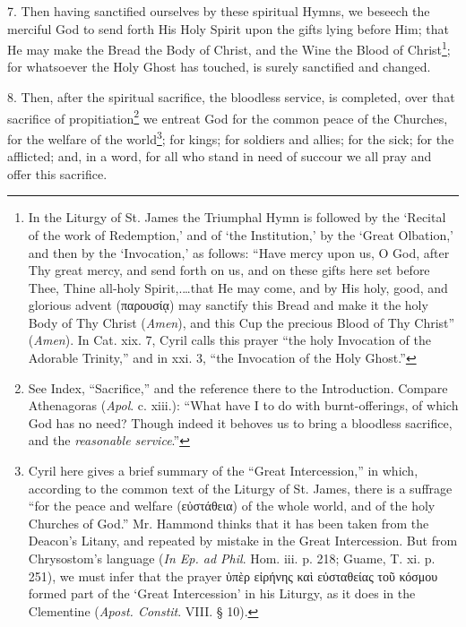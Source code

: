 7. Then having sanctified ourselves by these spiritual Hymns, we beseech the merciful God to send forth His Holy Spirit upon the gifts lying before Him; that He may make the Bread the Body of Christ, and the Wine the Blood of Christ\footnote{In the Liturgy of St. James the Triumphal Hymn is followed by the ‘Recital of the work of Redemption,’ and of ‘the Institution,’ by the ‘Great Olbation,’ and then by the ‘Invocation,’ as follows: “Have mercy upon us, O God, after Thy great mercy, and send forth on us, and on these gifts here set before Thee, Thine all-holy Spirit,.…that He may come, and by His holy, good, and glorious advent (\textgreek{παρουσίᾳ}) may sanctify this Bread and make it the holy Body of Thy Christ (\emph{Amen}), and this Cup the precious Blood of Thy Christ” (\emph{Amen}). In Cat. xix. 7, Cyril calls this prayer “the holy Invocation of the Adorable Trinity,” and in xxi. 3, “the Invocation of the Holy Ghost.”}; for whatsoever the Holy Ghost has touched, is surely sanctified and changed.

8. Then, after the spiritual sacrifice, the bloodless service, is completed, over that sacrifice of propitiation\footnote{See Index, “Sacrifice,” and the reference there to the Introduction. Compare Athenagoras (\emph{Apol}. c. xiii.): “What have I to do with burnt-offerings, of which God has no need? Though indeed it behoves us to bring a bloodless sacrifice, and the \emph{reasonable service}.”} we entreat God for the common peace of the Churches, for the welfare of the world\footnote{Cyril here gives a brief summary of the “Great Intercession,” in which, according to the common text of the Liturgy of St. James, there is a suffrage “for the peace and welfare (\textgreek{εὐστάθεια}) of the whole world, and of the holy Churches of God.” Mr. Hammond thinks that it has been taken from the Deacon’s Litany, and repeated by mistake in the Great Intercession. But from Chrysostom’s language (\emph{In Ep. ad Phil}. Hom. iii. p. 218; Guame, T. xi. p. 251), we must infer that the prayer \textgreek{ὑπὲρ εἰρήνης καὶ εὐσταθείας τοῦ κόσμου} formed part of the ‘Great Intercession’ in his Liturgy, as it does in the Clementine (\emph{Apost. Constit}. VIII. § 10).}; for kings; for soldiers and allies; for the sick; for the afflicted; and, in a word, for all who stand in need of succour we all pray and offer this sacrifice.

